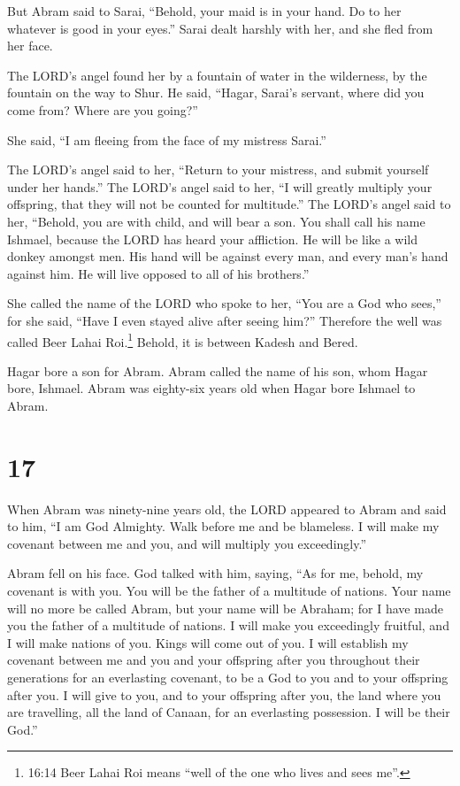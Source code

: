  But Abram said to Sarai, ``Behold, your maid is in your
hand. Do to her whatever is good in your eyes.'' Sarai dealt harshly
with her, and she fled from her face.

 The LORD's angel found her by a fountain of water in the
wilderness, by the fountain on the way to Shur.  He said,
``Hagar, Sarai's servant, where did you come from? Where are you
going?''

She said, ``I am fleeing from the face of my mistress Sarai.''

 The LORD's angel said to her, ``Return to your mistress,
and submit yourself under her hands.''  The LORD's angel
said to her, ``I will greatly multiply your offspring, that they will
not be counted for multitude.''  The LORD's angel said to
her, ``Behold, you are with child, and will bear a son. You shall call
his name Ishmael, because the LORD has heard your affliction.
 He will be like a wild donkey amongst men. His hand will
be against every man, and every man's hand against him. He will live
opposed to all of his brothers.''

 She called the name of the LORD who spoke to her, ``You
are a God who sees,'' for she said, ``Have I even stayed alive after
seeing him?''  Therefore the well was called Beer Lahai
Roi.\footnote{16:14 Beer Lahai Roi means ``well of the one who lives and
  sees me''.} Behold, it is between Kadesh and Bered.

 Hagar bore a son for Abram. Abram called the name of his
son, whom Hagar bore, Ishmael.  Abram was eighty-six years
old when Hagar bore Ishmael to Abram.

\hypertarget{section-16}{%
\section{17}\label{section-16}}

 When Abram was ninety-nine years old, the LORD appeared to
Abram and said to him, ``I am God Almighty. Walk before me and be
blameless.  I will make my covenant between me and you, and
will multiply you exceedingly.''

 Abram fell on his face. God talked with him, saying,
 ``As for me, behold, my covenant is with you. You will be
the father of a multitude of nations.  Your name will no
more be called Abram, but your name will be Abraham; for I have made you
the father of a multitude of nations.  I will make you
exceedingly fruitful, and I will make nations of you. Kings will come
out of you.  I will establish my covenant between me and you
and your offspring after you throughout their generations for an
everlasting covenant, to be a God to you and to your offspring after
you.  I will give to you, and to your offspring after you,
the land where you are travelling, all the land of Canaan, for an
everlasting possession. I will be their God.''

